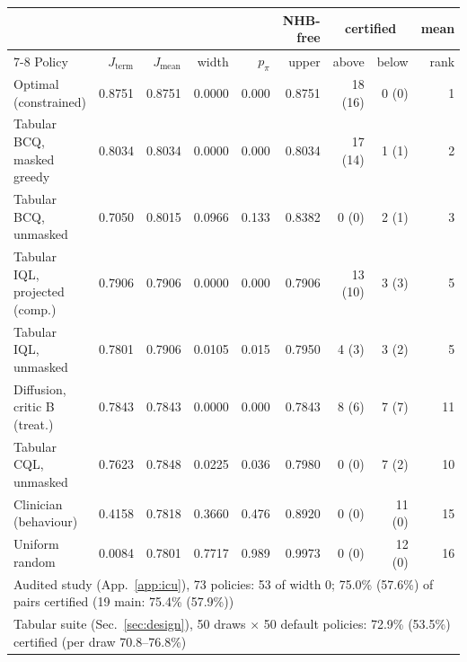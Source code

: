 \setlength{\tabcolsep}{3.5pt}%
\begin{tabular*}{\linewidth}{@{\extracolsep{\fill}}lrrrrrrrr}
\toprule
 & & & & & NHB-free & \multicolumn{2}{c}{certified} & mean \\
\cmidrule(lr){7-8}
Policy & $J_{\mathrm{term}}$ & $J_{\mathrm{mean}}$ & width & $p_\pi$ & upper & above & below & rank \\
\midrule
Optimal (constrained) & 0.8751 & 0.8751 & 0.0000 & 0.000 & 0.8751 & 18 (16) & 0 (0) & 1 \\
Tabular BCQ, masked greedy & 0.8034 & 0.8034 & 0.0000 & 0.000 & 0.8034 & 17 (14) & 1 (1) & 2 \\
Tabular BCQ, unmasked & 0.7050 & 0.8015 & 0.0966 & 0.133 & 0.8382 & 0 (0) & 2 (1) & 3 \\
Tabular IQL, projected (comp.) & 0.7906 & 0.7906 & 0.0000 & 0.000 & 0.7906 & 13 (10) & 3 (3) & 5 \\
Tabular IQL, unmasked & 0.7801 & 0.7906 & 0.0105 & 0.015 & 0.7950 & 4 (3) & 3 (2) & 5 \\
Diffusion, critic B (treat.) & 0.7843 & 0.7843 & 0.0000 & 0.000 & 0.7843 & 8 (6) & 7 (7) & 11 \\
Tabular CQL, unmasked & 0.7623 & 0.7848 & 0.0225 & 0.036 & 0.7980 & 0 (0) & 7 (2) & 10 \\
Clinician (behaviour) & 0.4158 & 0.7818 & 0.3660 & 0.476 & 0.8920 & 0 (0) & 11 (0) & 15 \\
Uniform random & 0.0084 & 0.7801 & 0.7717 & 0.989 & 0.9973 & 0 (0) & 12 (0) & 16 \\
\midrule
\multicolumn{9}{l}{Audited study (App.~\ref{app:icu}), 73 policies: 53 of width 0; 75.0\% (57.6\%) of pairs certified (19 main: 75.4\% (57.9\%))} \\
\multicolumn{9}{l}{Tabular suite (Sec.~\ref{sec:design}), 50 draws $\times$ 50 default policies: 72.9\% (53.5\%) certified (per draw 70.8--76.8\%)} \\
\bottomrule
\end{tabular*}
